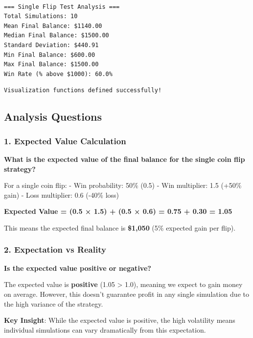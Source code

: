 \documentclass[
  letterpaper,
  DIV=11,
  numbers=noendperiod]{scrartcl}
\begin{document}
\label{analysis-functions}
\begin{verbatim}

=== Single Flip Test Analysis ===
Total Simulations: 10
Mean Final Balance: $1140.00
Median Final Balance: $1500.00
Standard Deviation: $440.91
Min Final Balance: $600.00
Max Final Balance: $1500.00
Win Rate (% above $1000): 60.0%
\end{verbatim}

\label{visualization-setup}
\begin{verbatim}
Visualization functions defined successfully!
\end{verbatim}

\subsection{Analysis Questions}\label{analysis-questions}

\subsubsection{1. Expected Value
Calculation}\label{expected-value-calculation}

\textbf{What is the expected value of the final balance for the single
coin flip strategy?}

For a single coin flip: - Win probability: 50\% (0.5) - Win multiplier:
1.5 (+50\% gain) - Loss multiplier: 0.6 (-40\% loss)

\textbf{Expected Value = (0.5 × 1.5) + (0.5 × 0.6) = 0.75 + 0.30 = 1.05}

This means the expected final balance is \textbf{\$1,050} (5\% expected
gain per flip).

\subsubsection{2. Expectation vs Reality}\label{expectation-vs-reality}

\textbf{Is the expected value positive or negative?}

The expected value is \textbf{positive} (1.05 \textgreater{} 1.0),
meaning we expect to gain money on average. However, this doesn't
guarantee profit in any single simulation due to the high variance of
the strategy.

\textbf{Key Insight}: While the expected value is positive, the high
volatility means individual simulations can vary dramatically from this
expectation.
\end{document}
